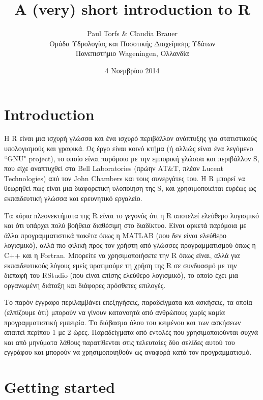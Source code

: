 \documentclass[a4paper,11pt,twocolumn,tablecaptionabove]{scrartcl}
\title{\vspace{-13mm}A (very) short introduction to R}
\author{Paul Torfs \& Claudia Brauer\\
\footnotesize{Ομάδα Υδρολογίας και Ποσοτικής Διαχείρισης Υδάτων}\\
\footnotesize{Πανεπιστήμιο Wageningen, Ολλανδία}}
\date{\small{4 Νοεμβρίου 2014}}
\begin{document}
\maketitle

\section{Introduction}

Η R είναι μια ισχυρή γλώσσα και ένα ισχυρό περιβάλλον ανάπτυξης για στατιστικούς
υπολογισμούς και γραφικά. Ως έργο είναι κοινό κτήμα (ή αλλιώς είναι ένα λεγόμενο ``GNU" project),
το οποίο είναι παρόμοιο με την εμπορική γλώσσα και περιβάλλον S, που είχε αναπτυχθεί στα Bell 
Laboratories (πρώην AT\&T, πλέον Lucent Technologies) από τον John Chambers και τους συνεργάτες
του. Η R μπορεί να θεωρηθεί πως είναι μια διαφορετική υλοποίηση της S, και χρησιμοποιείται ευρέως
ως εκπαιδευτική γλώσσα και ερευνητικό εργαλείο.

Τα κύρια πλεονεκτήματα της R είναι το γεγονός ότι η R αποτελεί ελεύθερο λογισμικό και ότι υπάρχει
πολύ βοήθεια διαθέσιμη στο διαδίκτυο. Είναι αρκετά παρόμοια με άλλα προγραμματιστικά πακέτα όπως 
η MATLAB (που δεν είναι ελεύθερο λογισμικό), αλλά πιο φιλική προς τον χρήστη από γλώσσες
προγραμματισμού όπως η C++ και η Fortran. Μπορείτε να χρησιμοποιήσετε την R όπως είναι, αλλά για
εκπαιδευτικούς λόγους εμείς προτιμούμε τη χρήση της R σε συνδυασμό με την διεπαφή του RStudio (που είναι επίσης ελεύθερο λογισμικό), το οποίο έχει μια οργανωμένη διάταξη και διάφορες πρόσθετες
επιλογές.

Το παρόν έγγραφο περιλαμβάνει επεξηγήσεις, παραδείγματα και ασκήσεις, τα οποία (ελπίζουμε ότι)
μπορούν να γίνουν κατανοητά από ανθρώπους χωρίς καμία προγραμματιστική εμπειρία. Το διάβασμα
όλου του κειμένου και των ασκήσεων απαιτεί περίπου 1 με 2 ώρες. Παραδείγματα από εντολές που 
χρησιμοποιούνται συχνά και από μηνύματα λάθους παρατίθενται στις τελευταίες δύο σελίδες αυτού
του εγγράφου και μπορούν να χρησιμοποιηθούν ως αναφορά κατά τον προγραμματισμό.

\section{Getting started}
\end{document}

